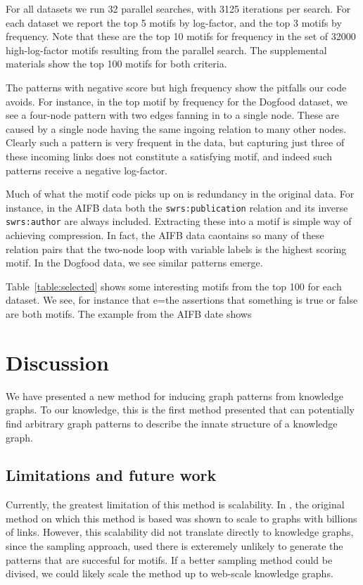 \documentclass[letterpaper]{article} %
\begin{document}

For all datasets we run 32 parallel searches, with 3125 iterations per search. For each dataset we report the top 5 motifs by log-factor, and the top 3 motifs by frequency. Note that these are the top 10 motifs for frequency in the set of 32000 high-log-factor motifs resulting from the parallel search. The supplemental materials show the top 100 motifs for both criteria.

The patterns with negative score but high frequency show the pitfalls our code avoids. For instance, in the top motif by frequency for the Dogfood dataset, we see a four-node pattern with two edges fanning in to a single node. These are caused by a single node having the same ingoing relation to many other nodes. Clearly such a pattern is very frequent in the data, but capturing just three of these incoming links does not constitute a satisfying motif, and indeed such patterns receive a negative log-factor.

Much of what the motif code picks up on is redundancy in the original data. For instance, in the AIFB data both the \texttt{swrs:publication} relation and its inverse \texttt{swrs:author} are always included. Extracting these into a motif is simple way of achieving compression. In fact, the AIFB data caontains so many of these relation pairs that the two-node loop with variable labels is the highest scoring motif. In the Dogfood data, we see similar patterns emerge.

Table~\ref{table:selected} shows some interesting motifs from the top 100 for each dataset. We see, for instance that e=the assertions that something is true or false are both motifs. The example from the AIFB date shows
\section{Discussion}

We have presented a new method for inducing graph patterns from knowledge graphs. To our knowledge, this is the first method presented that can potentially find arbitrary graph patterns to describe the innate structure of a knowledge graph.

\subsection{Limitations and future work}

Currently, the greatest limitation of this method is scalability. In \cite{bloem2017large}, the original method on which this method is based was shown to scale to graphs with billions of links. However, this scalability did not translate directly to knowledge graphs, since the sampling approach, used there is exteremely unlikely to generate the patterns that are succesful for motifs. If a better sampling method could be divised, we could likely scale the method up to web-scale knowledge graphs.
\end{document}
